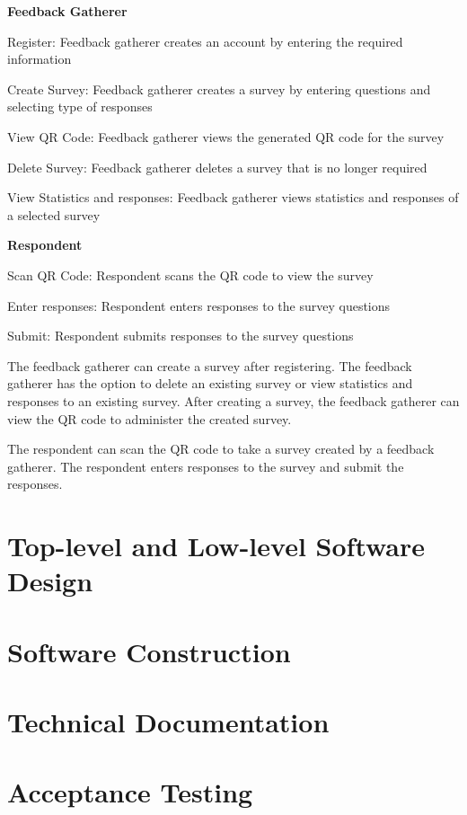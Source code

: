 \documentclass[letterpaper, 10 pt, conference]{ieeeconf}
\begin{document}
\textbf{Feedback Gatherer}
    
    Register: Feedback gatherer creates an account by entering the required information
    
    Create Survey: Feedback gatherer creates a survey by entering questions and selecting type of responses
    
    View QR Code: Feedback gatherer views the generated QR code for the survey
    
    Delete Survey: Feedback gatherer deletes a survey that is no longer required
    
    View Statistics and responses: Feedback gatherer views statistics and responses of a selected survey
    
\textbf{Respondent}
    
    Scan QR Code: Respondent scans the QR code to view the survey
    
    Enter responses: Respondent enters responses to the survey questions
    
    Submit: Respondent submits responses to the survey questions

The feedback gatherer can create a survey after registering. The feedback gatherer has the option to delete an existing survey or view statistics and responses to an existing survey. After creating a survey, the feedback gatherer can view the QR code to administer the created survey.

The respondent can scan the QR code to take a survey created by a feedback gatherer. The respondent enters responses to the survey and submit the responses.

\section{Top-level and Low-level Software Design}

\section{Software Construction}

\section{Technical Documentation}

\section{Acceptance Testing}
\end{document}
